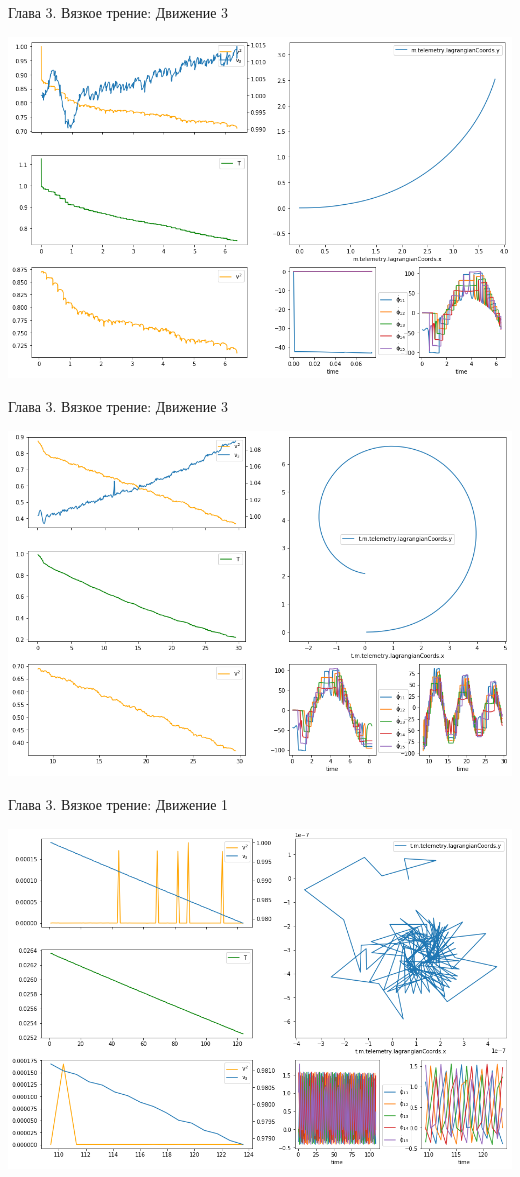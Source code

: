 \begin{frame}{Глава 3. Вязкое трение: Движение 3}

    \centering
    \includegraphics[width=\linewidth]{content/pic/new/visc_3_6.png}

\end{frame}

\begin{frame}{Глава 3. Вязкое трение: Движение 3}

    \centering
    \includegraphics[width=\linewidth]{content/pic/new/visc_3_30.png}

\end{frame}

\begin{frame}{Глава 3. Вязкое трение: Движение 1}

    \centering
    \includegraphics[width=\linewidth]{content/pic/new/visc_1_125.png}

\end{frame}
